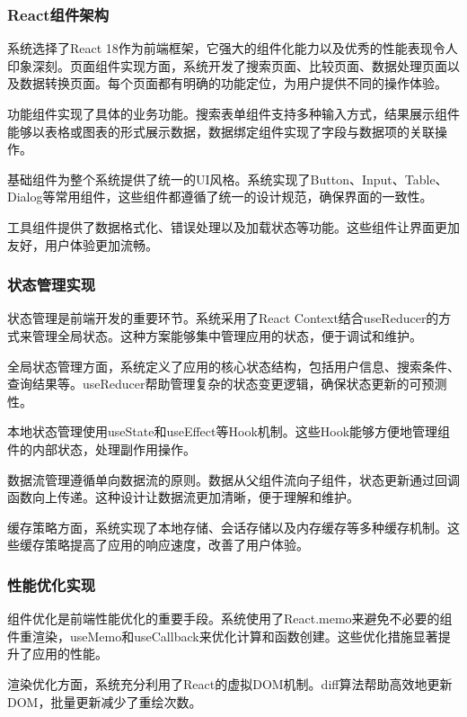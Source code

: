 \subsubsection{React组件架构}

系统选择了React 18作为前端框架，它强大的组件化能力以及优秀的性能表现令人印象深刻。页面组件实现方面，系统开发了搜索页面、比较页面、数据处理页面以及数据转换页面。每个页面都有明确的功能定位，为用户提供不同的操作体验。

功能组件实现了具体的业务功能。搜索表单组件支持多种输入方式，结果展示组件能够以表格或图表的形式展示数据，数据绑定组件实现了字段与数据项的关联操作。

基础组件为整个系统提供了统一的UI风格。系统实现了Button、Input、Table、Dialog等常用组件，这些组件都遵循了统一的设计规范，确保界面的一致性。

工具组件提供了数据格式化、错误处理以及加载状态等功能。这些组件让界面更加友好，用户体验更加流畅。

\subsubsection{状态管理实现}

状态管理是前端开发的重要环节。系统采用了React Context结合useReducer的方式来管理全局状态。这种方案能够集中管理应用的状态，便于调试和维护。

全局状态管理方面，系统定义了应用的核心状态结构，包括用户信息、搜索条件、查询结果等。useReducer帮助管理复杂的状态变更逻辑，确保状态更新的可预测性。

本地状态管理使用useState和useEffect等Hook机制。这些Hook能够方便地管理组件的内部状态，处理副作用操作。

数据流管理遵循单向数据流的原则。数据从父组件流向子组件，状态更新通过回调函数向上传递。这种设计让数据流更加清晰，便于理解和维护。

缓存策略方面，系统实现了本地存储、会话存储以及内存缓存等多种缓存机制。这些缓存策略提高了应用的响应速度，改善了用户体验。

\subsubsection{性能优化实现}

组件优化是前端性能优化的重要手段。系统使用了React.memo来避免不必要的组件重渲染，useMemo和useCallback来优化计算和函数创建。这些优化措施显著提升了应用的性能。

渲染优化方面，系统充分利用了React的虚拟DOM机制。diff算法帮助高效地更新DOM，批量更新减少了重绘次数。

